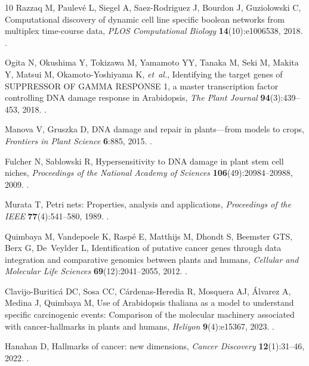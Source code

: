\documentclass{ws-jbcb}
\numberwithin{equation}{section}
\begin{document}
\begin{thebibliography}{10}
Razzaq M, Paulev{\'e} L, Siegel A, Saez-Rodriguez J, Bourdon J, Guziolowski C,
  Computational discovery of dynamic cell line specific boolean networks from
  multiplex time-course data, \emph{PLOS Computational Biology}
  \textbf{14}(10):e1006538, 2018.
\newblock {}.

Ogita N, Okushima Y, Tokizawa M, Yamamoto YY, Tanaka M, Seki M, Makita Y,
  Matsui M, Okamoto-Yoshiyama K, \emph{et~al.}, Identifying the target genes of
  {SUPPRESSOR OF GAMMA RESPONSE 1}, a master transcription factor controlling
  {DNA} damage response in {Arabidopsis}, \emph{The Plant Journal}
  \textbf{94}(3):439--453, 2018.
\newblock {}.

Manova V, Gruszka D, {DNA} damage and repair in plants---from models to crops,
  \emph{Frontiers in Plant Science} \textbf{6}:885, 2015.
\newblock {}.

Fulcher N, Sablowski R, Hypersensitivity to {DNA} damage in plant stem cell
  niches, \emph{Proceedings of the National Academy of Sciences}
  \textbf{106}(49):20984--20988, 2009.
\newblock {}.

Murata T, Petri nets: Properties, analysis and applications, \emph{Proceedings
  of the IEEE} \textbf{77}(4):541--580, 1989.
\newblock {}.

Quimbaya M, Vandepoele K, Rasp{\'e} E, Matthijs M, Dhondt S, Beemster GTS, Berx
  G, De~Veylder L, Identification of putative cancer genes through data
  integration and comparative genomics between plants and humans,
  \emph{Cellular and Molecular Life Sciences} \textbf{69}(12):2041--2055, 2012.
\newblock {}.

Clavijo-Buritic\'a DC, Sosa CC, C\'ardenas-Heredia R, Mosquera AJ, \'Alvarez A,
  Medina J, Quimbaya M, Use of {Arabidopsis thaliana} as a model to understand
  specific carcinogenic events: Comparison of the molecular machinery
  associated with cancer-hallmarks in plants and humans, \emph{Heliyon}
  \textbf{9}(4):e15367, 2023.
\newblock {}.

Hanahan D, Hallmarks of cancer: new dimensions, \emph{Cancer Discovery}
  \textbf{12}(1):31--46, 2022.
\newblock {}.


\end{thebibliography}
\end{document}
